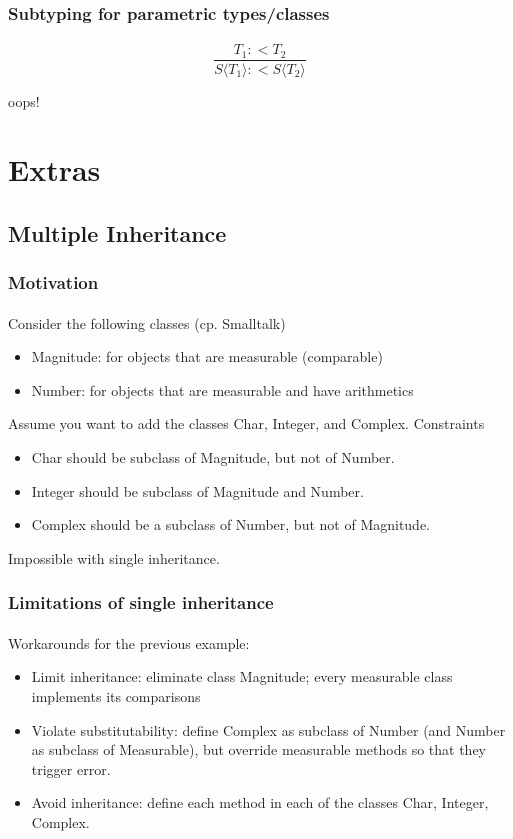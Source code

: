 \documentclass{beamer}
\begin{document}
\begin{frame}
\frametitle{Subtyping for parametric types/classes}
\framesubtitle{}

\[
\frac{T_1 :< T_2 }{S ⟨T_1⟩ :< S ⟨ T_2 ⟩}
\]

\pause

oops!

\end{frame}






\section{Extras}

\subsection{Multiple Inheritance}

\begin{frame}[fragile]
\frametitle{Motivation}
\framesubtitle{}
Consider the following classes (cp. Smalltalk)
\begin{itemize}
\item Magnitude: for objects that are measurable (comparable)
\item Number: for objects that are measurable and have arithmetics
\end{itemize}
Assume you want to add the classes Char, Integer, and Complex.
Constraints
\begin{itemize}
\item Char should be subclass of Magnitude, but not of Number.
\item Integer should be subclass of Magnitude and Number.
\item Complex should be a subclass of Number, but not of Magnitude.
\end{itemize}
Impossible with single inheritance.
\end{frame}

\begin{frame}[fragile]
\frametitle{Limitations of single inheritance}
\framesubtitle{}
Workarounds for the previous example:

\begin{itemize}
\item Limit inheritance: eliminate class Magnitude; every measurable
class implements its comparisons
\item Violate substitutability: define Complex as subclass of Number
(and Number as subclass of Measurable), but override measurable
methods so that they trigger error.
\item Avoid inheritance: define each method in each of the classes
Char, Integer, Complex.
\end{itemize}
\end{frame}
\end{document}
